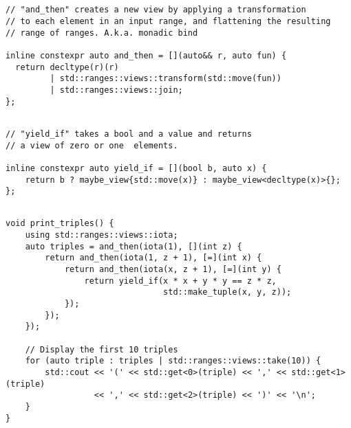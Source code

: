\documentclass[a4paper,10pt,oneside,openany,final,article]{memoir}
\begin{document}
\begin{minipage}[t]{\columnwidth}
  \begin{verbatim}


// "and_then" creates a new view by applying a transformation
// to each element in an input range, and flattening the resulting
// range of ranges. A.k.a. monadic bind

inline constexpr auto and_then = [](auto&& r, auto fun) {
  return decltype(r)(r)
         | std::ranges::views::transform(std::move(fun))
         | std::ranges::views::join;
};
\end{verbatim}
\end{minipage}

\leavevmode\newline

\begin{minipage}[t]{\columnwidth}
  \begin{verbatim}

// "yield_if" takes a bool and a value and returns
// a view of zero or one  elements.

inline constexpr auto yield_if = [](bool b, auto x) {
    return b ? maybe_view{std::move(x)} : maybe_view<decltype(x)>{};
};
\end{verbatim}
\end{minipage}

\leavevmode\newline

\begin{minipage}[t]{\columnwidth}
  \begin{verbatim}

void print_triples() {
    using std::ranges::views::iota;
    auto triples = and_then(iota(1), [](int z) {
        return and_then(iota(1, z + 1), [=](int x) {
            return and_then(iota(x, z + 1), [=](int y) {
                return yield_if(x * x + y * y == z * z,
                                std::make_tuple(x, y, z));
            });
        });
    });

    // Display the first 10 triples
    for (auto triple : triples | std::ranges::views::take(10)) {
        std::cout << '(' << std::get<0>(triple) << ',' << std::get<1>(triple)
                  << ',' << std::get<2>(triple) << ')' << '\n';
    }
}

\end{verbatim}
\end{minipage}

\leavevmode\newline
\end{document}
